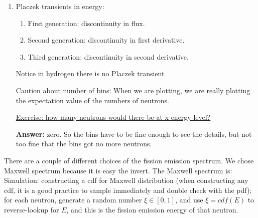 \documentclass{school-22.211-notes}
\begin{document}
\begin{enumerate}
\item Placzek transients in energy: 
\begin{enumerate}
\item First generation: discontinuity in flux. 
\item Second generation: discontinuity in first derivative. 
\item Third generation: discontinuity in second derivative. 
\end{enumerate}
Notice in hydrogen there is no Placzek transient


Caution about number of bins: When we are plotting, we are really plotting the expectation value of the numbers of neutrons. 

\uline{Exercise: how many neutrons would there be at x energy level?}  

\textbf{Answer:} zero. So the bins have to be fine enough to see the details, but not too fine that the bins got no more neutrons. 
\end{enumerate}



\clearpage
{}
There are a couple of different choices of the fission emission spectrum. We chose Maxwell spectrum because it is easy the invert. The Maxwell spectrum is:
Simulation: constructing a cdf for Maxwell distribution (when constructing any cdf, it is a good practice to sample immediately and double check with the pdf); for each neutron, generate a random number $\xi \in [0,1]$, and use $\xi = cdf(E)$ to reverse-lookup for $E$, and this is the fission emission energy of that neutron. 
\end{document}
